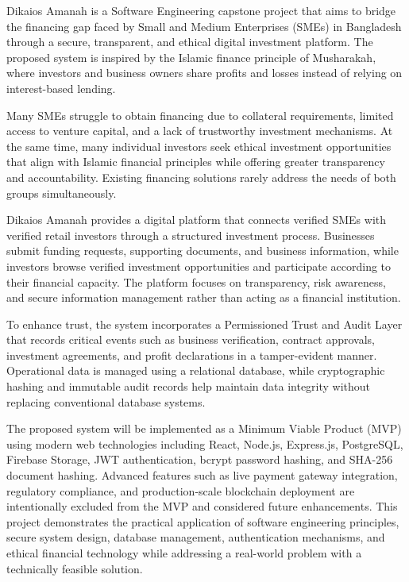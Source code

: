 Dikaios Amanah is a Software Engineering capstone project that aims to bridge the financing gap faced by Small and Medium Enterprises (SMEs) in Bangladesh through a secure, transparent, and ethical digital investment platform. The proposed system is inspired by the Islamic finance principle of Musharakah, where investors and business owners share profits and losses instead of relying on interest-based lending.

Many SMEs struggle to obtain financing due to collateral requirements, limited access to venture capital, and a lack of trustworthy investment mechanisms. At the same time, many individual investors seek ethical investment opportunities that align with Islamic financial principles while offering greater transparency and accountability. Existing financing solutions rarely address the needs of both groups simultaneously.

Dikaios Amanah provides a digital platform that connects verified SMEs with verified retail investors through a structured investment process. Businesses submit funding requests, supporting documents, and business information, while investors browse verified investment opportunities and participate according to their financial capacity. The platform focuses on transparency, risk awareness, and secure information management rather than acting as a financial institution.

To enhance trust, the system incorporates a Permissioned Trust and Audit Layer that records critical events such as business verification, contract approvals, investment agreements, and profit declarations in a tamper-evident manner. Operational data is managed using a relational database, while cryptographic hashing and immutable audit records help maintain data integrity without replacing conventional database systems.

The proposed system will be implemented as a Minimum Viable Product (MVP) using modern web technologies including React, Node.js, Express.js, PostgreSQL, Firebase Storage, JWT authentication, bcrypt password hashing, and SHA-256 document hashing. Advanced features such as live payment gateway integration, regulatory compliance, and production-scale blockchain deployment are intentionally excluded from the MVP and considered future enhancements.
This project demonstrates the practical application of software engineering principles, secure system design, database management, authentication mechanisms, and ethical financial technology while addressing a real-world problem with a technically feasible solution.